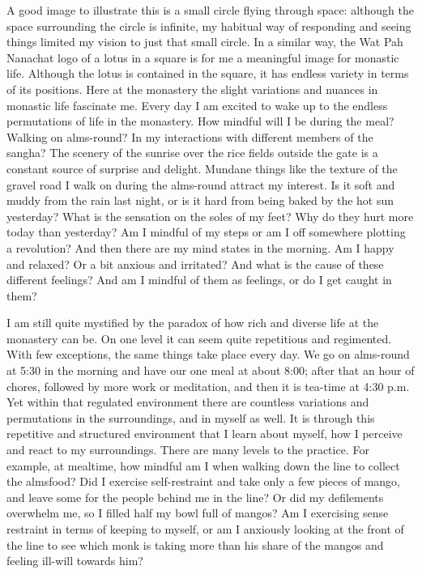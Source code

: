 A good image to illustrate this is a small circle flying through space: 
although the space surrounding the circle is infinite, my habitual way
of responding and seeing things limited my vision to just that small
circle. In a similar way, the Wat Pah Nanachat logo of a lotus in a
square is for me a meaningful image for monastic life. Although the
lotus is contained in the square, it has endless variety in terms of its
positions. Here at the monastery the slight variations and nuances in
monastic life fascinate me. Every day I am excited to wake up to the
endless permutations of life in the monastery. How mindful will I be
during the meal? Walking on alms-round? In my interactions with
different members of the sangha? The scenery of the sunrise over the
rice fields outside the gate is a constant source of surprise and
delight. Mundane things like the texture of the gravel road I walk on
during the alms-round attract my interest. Is it soft and muddy from the
rain last night, or is it hard from being baked by the hot sun
yesterday? What is the sensation on the soles of my feet? Why do they
hurt more today than yesterday? Am I mindful of my steps or am I off
somewhere plotting a revolution? And then there are my mind states in
the morning. Am I happy and relaxed? Or a bit anxious and irritated? And
what is the cause of these different feelings? And am I mindful of them
as feelings, or do I get caught in them? 

I am still quite mystified by the paradox of how rich and diverse life
at the monastery can be. On one level it can seem quite repetitious and
regimented. With few exceptions, the same things take place every day. 
We go on alms-round at 5:30 in the morning and have our one meal at
about 8:00; after that an hour of chores, followed by more work or
meditation, and then it is tea-time at 4:30 p.m. Yet within that
regulated environment there are countless variations and permutations in
the surroundings, and in myself as well. It is through this repetitive
and structured environment that I learn about myself, how I perceive and
react to my surroundings. There are many levels to the practice. For
example, at mealtime, how mindful am I when walking down the line to
collect the almsfood? Did I exercise self-restraint and take only a few
pieces of mango, and leave some for the people behind me in the line? Or
did my defilements overwhelm me, so I filled half my bowl full of
mangos? Am I exercising sense restraint in terms of keeping to myself, 
or am I anxiously looking at the front of the line to see which monk is
taking more than his share of the mangos and feeling ill-will towards
him? 

